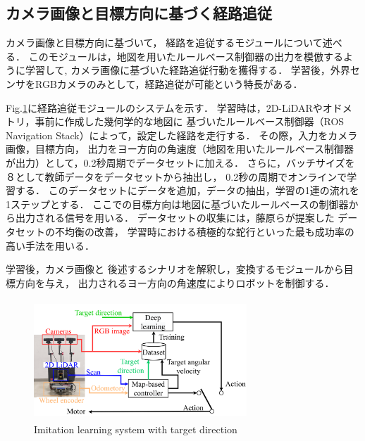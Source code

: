 \documentclass{sice-si}
\begin{document}
\subsection{カメラ画像と目標方向に基づく経路追従}
カメラ画像と目標方向に基づいて，
経路を追従するモジュールについて述べる．
このモジュールは，地図を用いたルールベース制御器の出力を模倣するように学習して,
カメラ画像に基づいた経路追従行動を獲得する．
学習後，外界センサをRGBカメラのみとして，経路追従が可能という特長がある．
\par
Fig.\ref{fig:learning}に経路追従モジュールのシステムを示す．
学習時は，2D-LiDARやオドメトリ，事前に作成した幾何学的な地図に
基づいたルールベース制御器（ROS Navigation Stack\cite{ros-navigation}）によって，設定した経路を走行する．
その際，入力をカメラ画像，目標方向，
出力をヨー方向の角速度（地図を用いたルールベース制御器が出力）として，0.2秒周期でデータセットに加える．
さらに，バッチサイズを８として教師データをデータセットから抽出し，
0.2秒の周期でオンラインで学習する．
このデータセットにデータを追加，データの抽出，学習の1連の流れを1ステップとする．
ここでの目標方向は地図に基づいたルールベースの制御器から出力される信号を用いる．
データセットの収集には，藤原ら\cite{fujiwara2023}が提案した
データセットの不均衡の改善，
学習時における積極的な蛇行といった最も成功率の高い手法を用いる．\par

学習後，カメラ画像と
後述するシナリオを解釈し，変換するモジュールから目標方向を与え，
出力されるヨー方向の角速度によりロボットを制御する．
\begin{figure}[h!]
    \centering
     \includegraphics[height=45mm,width=80mm]{./figs/learning_gamma.png}
     \caption{Imitation learning system with target direction}\label{fig:learning}
\end{figure}
\end{document}
